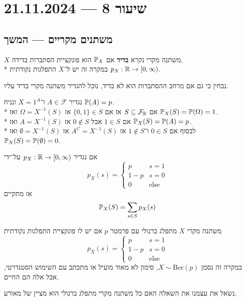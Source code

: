 \section{שיעור 8 --- 21.11.2024}

\subsection{משתנים מקריים --- המשך}
\begin{definition}\label{def_discrete_random_variable}
	$X$ משתנה מקרי נקרא \textbf{בדיד} אם $\mathbb{P}_X$ הוא פונקציית הסתברות בדידה. \\*
	במקרה זה יש ל־$X$ התפלגות נקודתית $p_X : \mathbb{R} \to [0, \infty)$.
\end{definition}
\begin{remark}
	נבחין כי גם אם מרחב ההסתברות הוא לא בדיד, נוכל להגדיר משתנה מקרי בדיד עליו.
\end{remark}
\begin{example}
	נגדיר $A \in \mathcal{F}$ ו־$X = 1^A$ ונניח $\mathbb{P}(A) = p$. \\*
	אם $S \subseteq \mathcal{F}_{\mathbb{R}}$ אז אם $\{0, 1 \} \in S$ אז $\Omega = X^{-1}(S)$ ואז $\mathbb{P}_X(S) = \mathbb{P}(\Omega) = 1$. \\*
	אם $1 \in S$ אבל $0 \notin S$ אז $A = X^{-1}(S)$ ואז $\mathbb{P}_X(S) = \mathbb{P}(A) = p$. \\*
	לבסוף אם $0 \in S$ ו־$1 \notin S$ אז $A^C = X^{-1}(S)$ אז $\emptyset = X^{-1}(S)$ ואז $\mathbb{P}_X(S) = \mathbb{P}(\emptyset) = 0$.

	אם נגדיר $p_X : \mathbb{R} \to [0, \infty)$ על־ידי
	\[
		p_X(s) = \begin{cases}
			p & s = 1 \\
			1 - p & s = 0 \\
			0 & \text{else}
		\end{cases}
	\]
	אז מתקיים
	\[
		\mathbb{P}_X(S) = \sum_{s \in S} p_X(s)
	\]
\end{example}
\begin{definition}
	משתנה מקרי $X$ מתפלג ברנולי עם פרמטר $p$ אם יש לו פונקציית התפלגות נקודתית
	\[
		p_X(s) = \begin{cases}
			p & s = 1 \\
			1 - p & s = 0 \\
			0 & \text{else}
		\end{cases}
	\]
	במקרה זה נסמן $X \sim \text{Ber}(p)$, סימון לא מאוד מועיל או מתכתב עם השימוש הסטנדרטי, אבל אלה הם החיים.
\end{definition}
נשאל את עצמנו את השאלה האם כל משתנה מקרי מתפלג ברנולי הוא מציין של מאורע.
